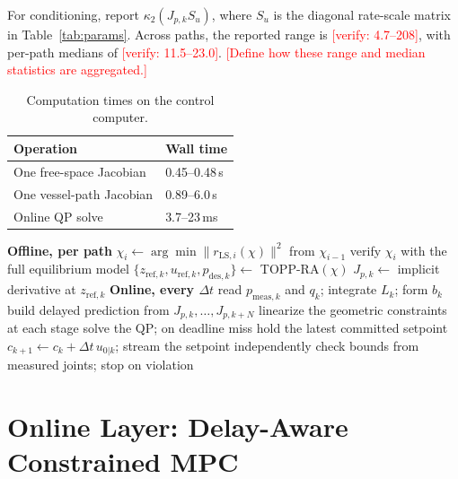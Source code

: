 \documentclass[journal]{IEEEtran}
\newcommand{\TBD}[1]{\textcolor{red}{[#1]}}
\begin{document}
For conditioning, report $\kappa_2(J_{p,k}S_u)$, where $S_u$ is the
diagonal rate-scale matrix in Table~\ref{tab:params}. Across paths, the
reported range is \TBD{verify: 4.7--208}, with per-path medians of
\TBD{verify: 11.5--23.0}. \TBD{Define how these range and median
statistics are aggregated.}

\begin{table}[t]
\centering
\caption{Computation times on the control computer.}
\label{tab:compute}
\footnotesize
\begin{tabular}{@{}ll@{}}
\toprule
Operation & Wall time \\
\midrule
One free-space Jacobian & 0.45--0.48\,s \\
One vessel-path Jacobian & 0.89--6.0\,s \\
Online QP solve & 3.7--23\,ms \\
\bottomrule
\end{tabular}
\end{table}

\begin{algorithm}[t]
\caption{Offline--online framework}
\label{alg:framework}
\footnotesize
\begin{algorithmic}[1]
\Statex \textbf{Offline, per path}
  \State $\chi_i\gets\arg\min\|r_{\mathrm{LS},i}(\chi)\|^2$ from $\chi_{i-1}$ 
  \State verify $\chi_i$ with the full equilibrium model \Comment{\eqref{eq:equilibrium}}
\EndFor
\State $\{z_{\mathrm{ref},k},u_{\mathrm{ref},k},p_{\mathrm{des},k}\}\gets$ TOPP-RA$(\chi)$ 
  \State $J_{p,k}\gets$ implicit derivative at $z_{\mathrm{ref},k}$ 
\EndFor
\Statex \textbf{Online, every $\Delta t$}
\State read $p_{\mathrm{meas},k}$ and $q_k$; integrate $L_k$; form $b_k$ \Comment{\eqref{eq:offset}}
\State build delayed prediction from $J_{p,k},\ldots,J_{p,k+N}$ \Comment{\eqref{eq:delay}--\eqref{eq:prediction}}
\State linearize the geometric constraints at each stage
\State solve the QP; on deadline miss hold the latest committed setpoint
\State $c_{k+1}\gets c_k+\Delta t\,u_{0|k}$; stream the setpoint
\State independently check bounds from measured joints; stop on violation
\end{algorithmic}
\end{algorithm}

\section{Online Layer: Delay-Aware Constrained MPC}
\label{sec:online}
\end{document}
